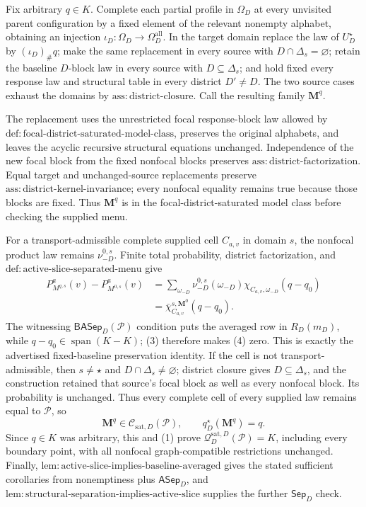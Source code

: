 Fix arbitrary \(q\in K\).  Complete each partial profile in \(\Omega_D\) at every unvisited parent configuration by a fixed element of the relevant nonempty alphabet, obtaining an injection \(\iota_D:\Omega_D\to\Omega_D^{\mathrm{all}}\).  In the target domain replace the law of \(U_D^\star\) by \((\iota_D)_\#q\); make the same replacement in every source with \(D\cap\Delta_s=\varnothing\); retain the baseline \(D\)-block law in every source with \(D\subseteq\Delta_s\); and hold fixed every response law and structural table in every district \(D'\ne D\).  The two source cases exhaust the domains by \(\mathrm{ass:district\text{-}closure}\).  Call the resulting family \(\mathbf M^q\).

The replacement uses the unrestricted focal response-block law allowed by \(\mathrm{def:focal\text{-}district\text{-}saturated\text{-}model\text{-}class}\), preserves the original alphabets, and leaves the acyclic recursive structural equations unchanged.  Independence of the new focal block from the fixed nonfocal blocks preserves \(\mathrm{ass:district\text{-}factorization}\).  Equal target and unchanged-source replacements preserve \(\mathrm{ass:district\text{-}kernel\text{-}invariance}\); every nonfocal equality remains true because those blocks are fixed.  Thus \(\mathbf M^q\) is in the focal-district-saturated model class before checking the supplied menu.

For a transport-admissible complete supplied cell \(C_{a,v}\) in domain \(s\), the nonfocal product law remains \(\nu_{-D}^{0,s}\).  Finite total probability, district factorization, and \(\mathrm{def:active\text{-}slice\text{-}separated\text{-}menu}\) give
\[
\begin{aligned}
P_{M^{q,s}}^a(v)-P_{M^{0,s}}^a(v)
&=\sum_{\omega_{-D}}\nu_{-D}^{0,s}(\omega_{-D})
\chi_{C_{a,v},\omega_{-D}}(q-q_0)\\
&=\bar\chi_{C_{a,v}}^{s,\mathbf M^0}(q-q_0).
\end{aligned}
\tag{4}
\]
The witnessing \(\mathsf{BASep}_D(\mathcal P)\) condition puts the averaged row in \(R_D(m_D)\), while \(q-q_0\in\operatorname{span}(K-K)\); (3) therefore makes (4) zero.  This is exactly the advertised fixed-baseline preservation identity.  If the cell is not transport-admissible, then \(s\ne\star\) and \(D\cap\Delta_s\ne\varnothing\); district closure gives \(D\subseteq\Delta_s\), and the construction retained that source's focal block as well as every nonfocal block.  Its probability is unchanged.  Thus every complete cell of every supplied law remains equal to \(\mathcal P\), so
\[
\mathbf M^q\in\mathcal C_{\mathrm{sat},D}(\mathcal P),
\qquad q_D^\star(\mathbf M^q)=q.
\]
Since \(q\in K\) was arbitrary, this and (1) prove
\(\mathcal Q_D^{\mathrm{sat},D}(\mathcal P)=K\), including every boundary point, with all nonfocal graph-compatible restrictions unchanged.  Finally, \(\mathrm{lem:active\text{-}slice\text{-}implies\text{-}baseline\text{-}averaged}\) gives the stated sufficient corollaries from nonemptiness plus \(\mathsf{ASep}_D\), and \(\mathrm{lem:structural\text{-}separation\text{-}implies\text{-}active\text{-}slice}\) supplies the further \(\mathsf{Sep}_D\) check.